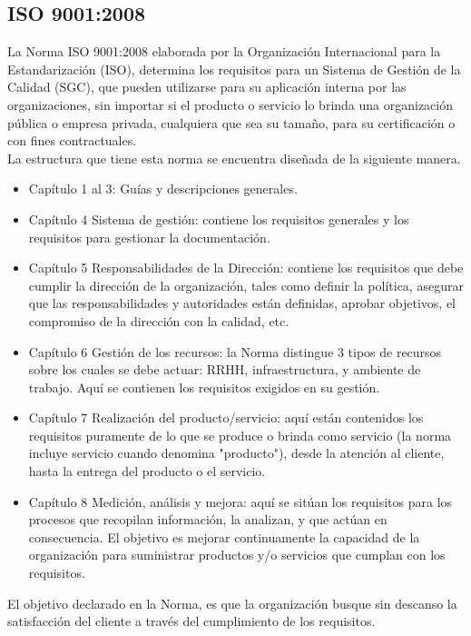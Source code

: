 	\subsection{ISO 9001:2008}
	La Norma ISO 9001:2008 elaborada por la Organización Internacional para la Estandarización (ISO), determina los requisitos para un Sistema de Gestión de la Calidad (SGC), que pueden utilizarse para su aplicación interna por las organizaciones, sin importar si el producto o servicio lo brinda una organización pública o empresa privada, cualquiera que sea su tamaño, para su certificación o con fines contractuales.\\
	
	La estructura que tiene esta norma se encuentra diseñada de la siguiente manera.\\
	
	\begin{itemize}
		\item Capítulo 1 al 3: Guías y descripciones generales.
		\item Capítulo 4 Sistema de gestión: contiene los requisitos generales y los requisitos para gestionar la documentación.
		\item Capítulo 5 Responsabilidades de la Dirección: contiene los requisitos que debe cumplir la dirección de la organización, tales como definir la política, asegurar que las responsabilidades y autoridades están definidas, aprobar objetivos, el compromiso de la dirección con la calidad, etc.
		\item Capítulo 6 Gestión de los recursos: la Norma distingue 3 tipos de recursos sobre los cuales se debe actuar: RRHH, infraestructura, y ambiente de trabajo. Aquí se contienen los requisitos exigidos en su gestión.
		\item Capítulo 7 Realización del producto/servicio: aquí están contenidos los requisitos puramente de lo que se produce o brinda como servicio (la norma incluye servicio cuando denomina "producto"), desde la atención al cliente, hasta la entrega del producto o el servicio.
		\item Capítulo 8 Medición, análisis y mejora: aquí se sitúan los requisitos para los procesos que recopilan información, la analizan, y que actúan en consecuencia. El objetivo es mejorar continuamente la capacidad de la organización para suministrar productos y/o servicios que cumplan con los requisitos.
	\end{itemize}
	
	El objetivo declarado en la Norma, es que la organización busque sin descanso la satisfacción del cliente a través del cumplimiento de los requisitos. \cite{ISO9001}\\
	
